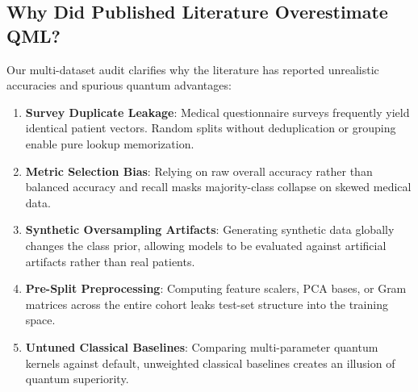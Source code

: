 \documentclass[journal,twocolumn]{IEEEtran}
\begin{document}
\subsection{Why Did Published Literature Overestimate QML?}
Our multi-dataset audit clarifies why the literature has reported unrealistic accuracies and spurious quantum advantages:
\begin{enumerate}
    \item \textbf{Survey Duplicate Leakage}: Medical questionnaire surveys frequently yield identical patient vectors. Random splits without deduplication or grouping enable pure lookup memorization.
    \item \textbf{Metric Selection Bias}: Relying on raw overall accuracy rather than balanced accuracy and recall masks majority-class collapse on skewed medical data.
    \item \textbf{Synthetic Oversampling Artifacts}: Generating synthetic data globally changes the class prior, allowing models to be evaluated against artificial artifacts rather than real patients.
    \item \textbf{Pre-Split Preprocessing}: Computing feature scalers, PCA bases, or Gram matrices across the entire cohort leaks test-set structure into the training space.
    \item \textbf{Untuned Classical Baselines}: Comparing multi-parameter quantum kernels against default, unweighted classical baselines creates an illusion of quantum superiority.
\end{enumerate}
\end{document}
